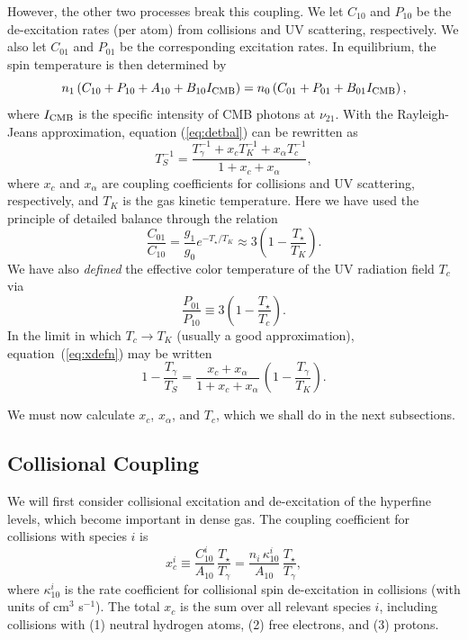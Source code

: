 \documentclass[a4paper,openany, 12pt]{book}
\begin{document}
However, the other two processes break this coupling. We let $C_{10}$ and $P_{10}$ be the de-excitation rates (per atom) from collisions and UV scattering, respectively.  We also let $C_{01}$ and $P_{01}$ be the
corresponding excitation rates.  In equilibrium, the spin temperature is then
determined by
\begin{equation}
n_1 \left( C_{10} + P_{10} + A_{10} + B_{10} I_{\rm CMB} \right) = n_0 \left( C_{01} + P_{01} + B_{01} I_{\rm CMB} \right),
\label{eq:detbal}
\end{equation}
where $I_{\rm CMB}$ is the specific intensity of CMB photons at $\nu_{21}$.  With the Rayleigh-Jeans approximation, equation (\ref{eq:detbal}) can be rewritten as
\begin{equation}
T_S^{-1} = \frac{T_\gamma^{-1} + x_c T_K^{-1} + x_\alpha T_c^{-1}}{1 + x_c + x_\alpha},
\label{eq:xdefn}
\end{equation}
where $x_c$ and $x_\alpha$ are coupling coefficients for collisions and UV scattering, respectively, and $T_K$ is the gas kinetic temperature.  Here we have used the principle of detailed balance through the relation
\begin{equation}
\frac{C_{01}}{C_{10}} = \frac{g_1}{g_0} e^{-T_\star/T_K} \approx 3 \left( 1 - \frac{T_\star}{T_K} \right).
\label{eq:c01db}
\end{equation}
We have also \emph{defined} the effective color temperature of the UV radiation field $T_c$ via
\begin{equation}
\frac{P_{01}}{P_{10}} \equiv 3 \left( 1 - \frac{T_\star}{T_c} \right).
\label{eq:tcolor}
\end{equation}
In the limit in which $T_c \rightarrow T_K$ (usually a good approximation), equation~(\ref{eq:xdefn}) may be written 
\begin{equation}
1 - \frac{T_\gamma}{T_S} = \frac{x_c + x_\alpha}{1 + x_c + x_\alpha} \, \left( 1 - \frac{T_\gamma}{T_K} \right).
\label{eq:xdefn-tfac}
\end{equation}

We must now calculate $x_c$,  $x_\alpha$, and $T_c$, which we shall do in the next subsections.

\subsection{Collisional Coupling} \label{coll}

We will first consider collisional excitation and de-excitation of the hyperfine levels, which become important in dense gas.  The coupling coefficient for collisions with species $i$ is
\begin{equation}
x_c^i \equiv  \frac{C_{10}^i}{A_{10}} \, \frac{T_\star}{T_\gamma} = \frac{n_i \, \kappa_{10}^i}{A_{10}} \, \frac{T_\star}{T_\gamma},
\label{eq:xcdefn}
\end{equation}
where $\kappa_{10}^i$ is the rate coefficient for collisional spin de-excitation in collisions (with units of cm$^3$ s$^{-1}$).  The total $x_c$ is the sum over all relevant species $i$, including collisions with (1) neutral hydrogen atoms, (2) free electrons, and (3) protons.  
\end{document}
